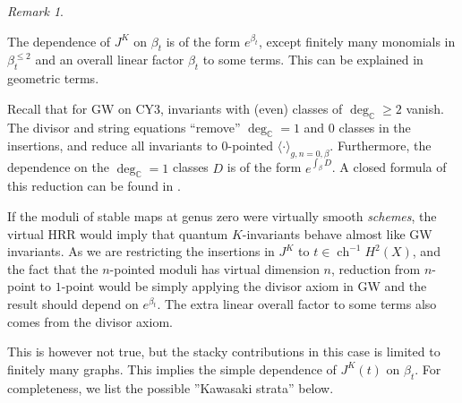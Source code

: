 \documentclass[11pt]{amsart}
\newtheorem*{main theorem*}{Main Theorem}
\theoremstyle{remark}
\newtheorem{remark}[theorem]{Remark}
\numberwithin{equation}{section}
\newcommand{\op}{\operatorname}
\begin{document}
\begin{remark} \label{r:3.14}

The dependence of $J^K$ on $\beta_t$ is of the form $e^{\beta_t}$, except finitely many monomials in $\beta_t^{\leq 2}$ and an overall linear factor $\beta_t$ to some terms. This can be explained in geometric terms.

Recall that for GW on CY3, invariants with (even) classes of $\deg_{\mathbb{C}} \geq 2$ vanish. The divisor and string equations ``remove'' $\deg_{\mathbb{C}} =1$ and $0$ classes in the insertions, and reduce all invariants to $0$-pointed  $\langle \cdot \rangle_{g, n=0,\beta}$. Furthermore, the dependence on the $\deg_{\mathbb{C}}=1$ classes $D$ is of the form $e^{\int_{\beta} D}$. A closed formula of this reduction can be found in \cite{Fan_Lee_2019}. 

If the moduli of stable maps at genus zero were virtually smooth \emph{schemes}, the virtual HRR would imply that quantum $K$-invariants behave almost like GW invariants. As we are restricting the insertions in $J^K$ to $t \in \op{ch}^{-1} H^2(X)$, and the fact that the $n$-pointed moduli has virtual dimension $n$, reduction from $n$-point to $1$-point would be simply applying the divisor axiom in GW and the result should depend on $e^{\beta_t}$. The extra linear overall factor to some terms also comes from the divisor axiom.

This is however not true, but the stacky contributions \cite[Theorem~5.1]{Ediddin_RR} in this case is limited to finitely many graphs. This implies the simple dependence of $J^K (t)$ on $\beta_t$. For completeness, we list the possible ''Kawasaki strata'' below.


\end{remark}
\end{document}
